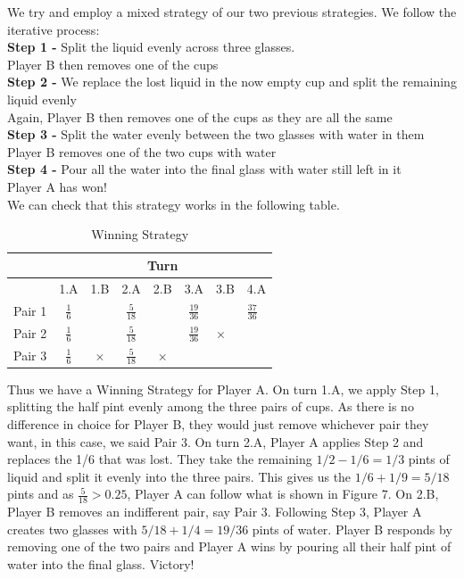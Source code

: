 \documentclass[11pt]{article}
\newcommand{\keywordfont}{\textsc}
\newcommand{\keyword}[1]{%
  \marginpar{\raggedright\small\keywordfont{#1}}}
\begin{document}
We try and \keyword{Try} employ a mixed strategy of our two previous strategies. We follow the iterative process: \\
\textbf{Step 1 -} Split the liquid evenly across three glasses. \\
Player B then removes one of the cups \\
\textbf{Step 2 -} We replace the lost liquid in the now empty cup and split the remaining liquid evenly  \\
Again, Player B then removes one of the cups as they are all the same \\
\textbf{Step 3 -} Split the water evenly between the two glasses with water in them\\
Player B removes one of the two cups with water \\
\textbf{Step 4 -} Pour all the water into the final glass with water still left in it\\
Player A has won! \\
We can check that this \keyword{Check} strategy works in the following table.
\begin{table}[h]
    \centering
    \renewcommand{\arraystretch}{1.3}
    \begin{tabular}{|c|c|c|c|c|c|l|l|} \hline 
 & \multicolumn{7}{|c|}{Turn}\\ \hline 
         &  1.A&  1.B&  2.A&  2.B& 3.A& 3.B& 4.A\\ \hline 
         Pair 1&  $\frac{1}{6}$&  &  $\frac{5}{18}$&  &  $\frac{19}{36}$& & $\frac{37}{36}$\\ \hline 
         Pair 2&  $\frac{1}{6}$&  &  $\frac{5}{18}$&  &  $\frac{19}{36}$& $\times$& \\ \hline 
         Pair 3&  $\frac{1}{6}$&  $\times$&  $\frac{5}{18}$&  $\times$&  & & \\ \hline
    \end{tabular}
    \caption{Winning Strategy}
    \label{tab:my_label}
\end{table}

Thus we have a Winning Strategy for Player A. On turn 1.A, we apply Step 1, splitting the half pint evenly among the three pairs of cups. As there is no difference in choice for Player B, they would just remove whichever pair they want, in this case, we said Pair 3. On turn 2.A, Player A applies Step 2 and replaces the 1/6 that was lost. They take the remaining $1/2 - 1/6 = 1/3$ \keyword{Check} pints of liquid and split it evenly into the three pairs. This gives us the $1/6 + 1/9 = 5/18$ pints and as $\frac{5}{18} > 0.25$, Player A can follow what is shown in Figure 7. On 2.B, Player B removes an indifferent pair, say Pair 3. Following Step 3, Player A creates two glasses with $5/18 + 1/4 = 19/36$ pints of water. Player B responds by removing one of the two pairs and Player A wins by pouring all their half pint of water into the final glass. Victory! \keyword{AHA}
\end{document}
